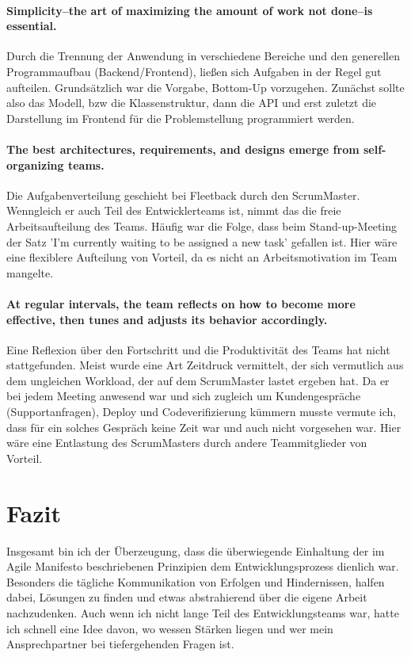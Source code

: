 \documentclass[ngerman]{scrartcl}
\begin{document}
\paragraph{Simplicity--the art of maximizing the amount of work not done--is essential.}
Durch die Trennung der Anwendung in verschiedene Bereiche und den generellen Programmaufbau (Backend/Frontend), ließen sich Aufgaben in der Regel gut aufteilen. Grundsätzlich war die Vorgabe, Bottom-Up vorzugehen. Zunächst sollte also das Modell, bzw die Klassenstruktur, dann die API und erst zuletzt die Darstellung im Frontend für die Problemstellung programmiert werden.


\paragraph{The best architectures, requirements, and designs emerge from self-organizing teams.}
Die Aufgabenverteilung geschieht bei Fleetback durch den ScrumMaster. Wenngleich er auch Teil des Entwicklerteams ist, nimmt das die freie Arbeitsaufteilung des Teams. Häufig war die Folge, dass beim Stand-up-Meeting der Satz 'I'm currently waiting to be assigned a new task' gefallen ist. Hier wäre eine flexiblere Aufteilung von Vorteil, da es nicht an Arbeitsmotivation im Team mangelte.


\paragraph{At regular intervals, the team reflects on how to become more effective, then tunes and adjusts its behavior accordingly.}
Eine Reflexion über den Fortschritt und die Produktivität des Teams hat nicht stattgefunden. Meist wurde eine Art Zeitdruck vermittelt, der sich vermutlich aus dem ungleichen Workload, der auf dem ScrumMaster lastet ergeben hat. Da er bei jedem Meeting anwesend war und sich zugleich um Kundengespräche (Supportanfragen), Deploy und Codeverifizierung kümmern musste vermute ich, dass für ein solches Gespräch keine Zeit war und auch nicht vorgesehen war. Hier wäre eine Entlastung des ScrumMasters durch andere Teammitglieder von Vorteil.


\section{Fazit}
Insgesamt bin ich der Überzeugung, dass die überwiegende Einhaltung der im Agile Manifesto beschriebenen Prinzipien dem Entwicklungsprozess dienlich war. Besonders die tägliche Kommunikation von Erfolgen und Hindernissen, halfen dabei, Lösungen zu finden und etwas abstrahierend über die eigene Arbeit nachzudenken. Auch wenn ich nicht lange Teil des Entwicklungsteams war, hatte ich schnell eine Idee davon, wo wessen Stärken liegen und wer mein Ansprechpartner bei tiefergehenden Fragen ist.

\newpage


\end{document}
